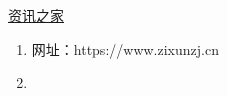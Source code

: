 \href{https://www.zixunzj.cn}{资讯之家}\begin{enumerate}
\item 网址：https://www.zixunzj.cn
\item 
\end{enumerate}
